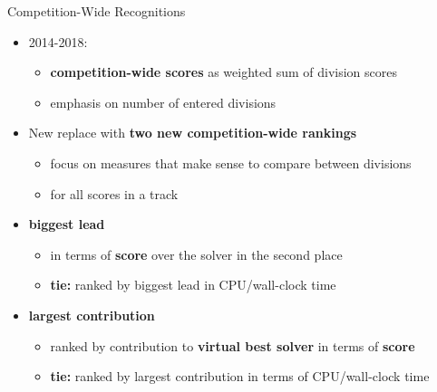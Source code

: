 \documentclass[10pt]{beamer}
\newcommand{\orange}[1]{\textcolor{mLightBrown}{#1}}
\begin{document}
  \begin{frame}{Competition-Wide Recognitions}
    \begin{itemize}
      \item \orange{2014-2018}:
        \begin{itemize}
          \item \textbf{competition-wide scores} as weighted sum of division
            scores
          \item emphasis on number of entered divisions
        \end{itemize}
      \vspace{1ex}
    \item \orange{New} replace with \textbf{two new competition-wide
      rankings}
      \begin{itemize}
        \item focus on measures that make sense to compare between divisions
        \item for all scores in a track
      \end{itemize}
      \vspace{1ex}
      \item \orange{\textbf{biggest lead}}
        \begin{itemize}
          \item in terms of \textbf{score} over the solver in the second place
          \item \textbf{tie:} ranked by biggest lead in CPU/wall-clock time
        \end{itemize}
      \vspace{1ex}
        \item \orange{\textbf{largest contribution}}
          \begin{itemize}
            \item ranked by contribution to \textbf{virtual best solver}
              in terms of \textbf{score}
            \item \textbf{tie:} ranked by largest contribution in terms of
              CPU/wall-clock time
          \end{itemize}
    \end{itemize}
  \end{frame}
\end{document}
